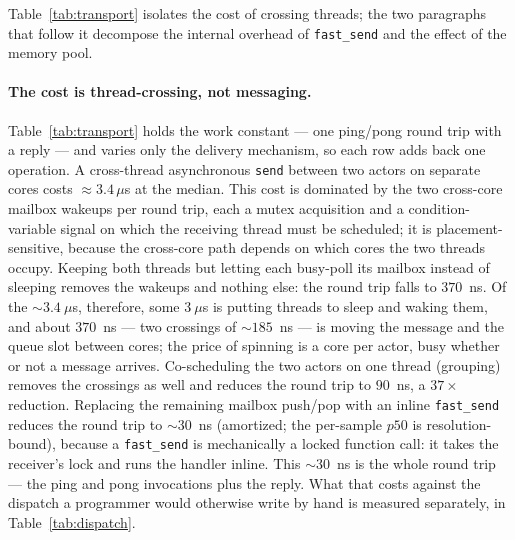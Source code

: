 \documentclass[11pt]{article}
\newcommand{\fs}{\texttt{fast\_send}}
\newcommand{\snd}{\texttt{send}}
\begin{document}
Table~\ref{tab:transport} isolates the cost of crossing threads; the two
paragraphs that follow it decompose the internal overhead of \fs{} and the
effect of the memory pool.

\paragraph{The cost is thread-crossing, not messaging.} Table~\ref{tab:transport}
holds the work constant --- one ping/pong round trip with a reply --- and varies
only the delivery mechanism, so each row adds back one operation. A cross-thread
asynchronous \snd{} between two actors on separate cores costs $\approx 3.4\,\mu$s
at the median. This cost is dominated by the two cross-core mailbox wakeups per
round trip, each a mutex acquisition and a condition-variable signal on which the
receiving thread must be scheduled; it is placement-sensitive, because the
cross-core path depends on which cores the two threads occupy. Keeping both
threads but letting each busy-poll its mailbox instead of sleeping removes the
wakeups and nothing else: the round trip falls to $370$~ns. Of the
$\sim\!3.4~\mu$s, therefore, some $3~\mu$s is putting threads to sleep and
waking them, and about $370$~ns --- two crossings of $\sim\!185$~ns --- is moving
the message and the queue slot between cores; the price of spinning is a core per
actor, busy whether or not a message arrives. Co-scheduling the two actors on one
thread (grouping) removes the crossings as well and reduces the round trip to
$90$~ns, a $37\times$ reduction. Replacing the remaining mailbox push/pop
with an inline \fs{} reduces the round trip to $\sim\!30$~ns (amortized; the
per-sample $p50$ is resolution-bound), because a \fs{} is mechanically a locked
function call: it takes the receiver's lock and runs the handler inline. This
$\sim\!30$~ns is the whole round trip --- the ping and pong invocations plus the
reply. What that costs against the dispatch a programmer would otherwise write by
hand is measured separately, in Table~\ref{tab:dispatch}.
\end{document}
